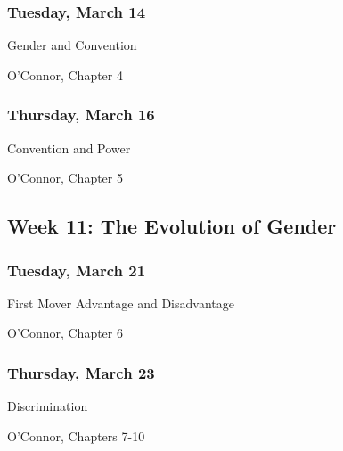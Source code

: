 \documentclass[
]{article}
\providecommand{\tightlist}{%
  \setlength{\itemsep}{0pt}\setlength{\parskip}{0pt}}
\begin{document}
\begin{multicols}{2}

\hypertarget{tuesday-march-14}{%
\subsubsection{Tuesday, March 14}\label{tuesday-march-14}}

\begin{description}
\tightlist
\item[Topic]
Gender and Convention
\item[Reading]
O'Connor, Chapter 4
\end{description}

\hypertarget{thursday-march-16}{%
\subsubsection{Thursday, March 16}\label{thursday-march-16}}

\begin{description}
\tightlist
\item[Topic]
Convention and Power
\item[Reading]
O'Connor, Chapter 5
\end{description}

\end{multicols}

\hypertarget{week-11-the-evolution-of-gender}{%
\subsection{Week 11: The Evolution of
Gender}\label{week-11-the-evolution-of-gender}}

\begin{multicols}{2}

\hypertarget{tuesday-march-21}{%
\subsubsection{Tuesday, March 21}\label{tuesday-march-21}}

\begin{description}
\tightlist
\item[Topic]
First Mover Advantage and Disadvantage
\item[Reading]
O'Connor, Chapter 6
\end{description}

\hypertarget{thursday-march-23}{%
\subsubsection{Thursday, March 23}\label{thursday-march-23}}

\begin{description}
\tightlist
\item[Topic]
Discrimination
\item[Reading]
O'Connor, Chapters 7-10
\end{description}

\end{multicols}
\end{document}
